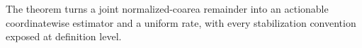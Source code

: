 The theorem turns a joint normalized-coarea remainder into an actionable coordinatewise estimator and a uniform rate, with every stabilization convention exposed at definition level.